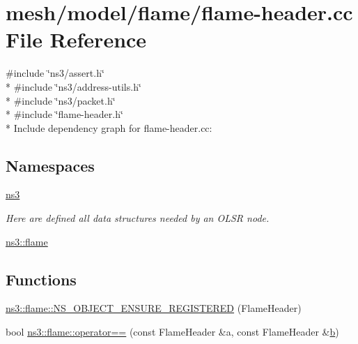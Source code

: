 \hypertarget{flame-header_8cc}{}\section{mesh/model/flame/flame-\/header.cc File Reference}
\label{flame-header_8cc}
{\ttfamily \#include \char`\"{}ns3/assert.\+h\char`\"{}}\\*
{\ttfamily \#include \char`\"{}ns3/address-\/utils.\+h\char`\"{}}\\*
{\ttfamily \#include \char`\"{}ns3/packet.\+h\char`\"{}}\\*
{\ttfamily \#include \char`\"{}flame-\/header.\+h\char`\"{}}\\*
Include dependency graph for flame-\/header.cc\+:
\subsection*{Namespaces}
\begin{DoxyCompactItemize}
\item 
 \hyperlink{namespacens3}{ns3}
\begin{DoxyCompactList}\small\item\em Here are defined all data structures needed by an O\+L\+SR node. \end{DoxyCompactList}\item 
 \hyperlink{namespacens3_1_1flame}{ns3\+::flame}
\end{DoxyCompactItemize}
\subsection*{Functions}
\begin{DoxyCompactItemize}
\item 
\hyperlink{namespacens3_1_1flame_ab6fec530f3dfe9e6492d5cf495fb5b35}{ns3\+::flame\+::\+N\+S\+\_\+\+O\+B\+J\+E\+C\+T\+\_\+\+E\+N\+S\+U\+R\+E\+\_\+\+R\+E\+G\+I\+S\+T\+E\+R\+ED} (Flame\+Header)
\item 
bool \hyperlink{namespacens3_1_1flame_a3b57e289b5f1e5ab8babfe2484ea5af8}{ns3\+::flame\+::operator==} (const Flame\+Header \&a, const Flame\+Header \&\hyperlink{lte__pathloss_8m_a21ad0bd836b90d08f4cf640b4c298e7c}{b})
\end{DoxyCompactItemize}
